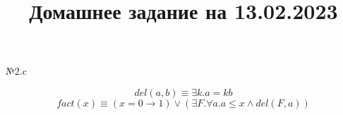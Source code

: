 \documentclass[14pt]{article}
\title{Домашнее задание на 13.02.2023}
\begin{document}
 \maketitle

\begin{center} №2.c \end{center}
$$
    del(a, b) \equiv \exists k. a = kb
$$
$$
    fact(x) \equiv (x=0 \rightarrow 1) \vee (\exists F. \forall a.a \leq x \wedge del(F, a)) 
$$
\end{document}

